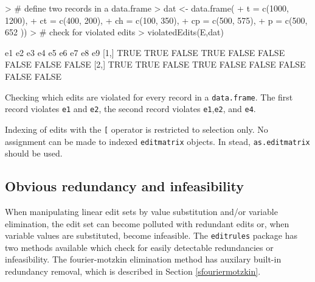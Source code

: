 \documentclass[10pt, fleqn, a4paper]{article}
\begin{document}
%
%
\begin{Rcode}
\begin{Schunk}
\begin{Sinput}
> # define two records in a data.frame
> dat <- data.frame(
+   t = c(1000, 1200),
+  ct = c(400,  200),
+  ch = c(100,  350),
+  cp = c(500,  575),
+  p =  c(500,  652 ))
> # check for violated edits
> violatedEdits(E,dat)
\end{Sinput}
\begin{Soutput}
       e1   e2    e3   e4    e5    e6    e7    e8    e9
[1,] TRUE TRUE FALSE TRUE FALSE FALSE FALSE FALSE FALSE
[2,] TRUE TRUE FALSE TRUE FALSE FALSE FALSE FALSE FALSE
\end{Soutput}
\end{Schunk}
\caption{Checking which edits are violated for every record in a {\tt data.frame}.
The first record violates {\tt e1} and {\tt e2}, the second record violates {\tt e1},{\tt e2}, and {\tt e4}.}
\label{violatedEdits}
\end{Rcode}
%
%
Indexing of edits with the {\tt [} operator is restricted to selection only. 
No assignment can be made to indexed {\tt editmatrix} objects. In stead, 
{\tt as.editmatrix} should be used.

\subsection{Obvious redundancy and infeasibility}
When manipulating linear edit sets by value substitution and/or variable
elimination, the edit set can become polluted with redundant edits or, when
variable values are substituted, become infeasible. The {\tt editrules} 
package has two methods available which check for easily detectable
redundancies or infeasibility. The fourier-motzkin elimination method
has auxilary built-in redundancy removal, which is described in Section
\ref{sfouriermotzkin}.
\end{document}
